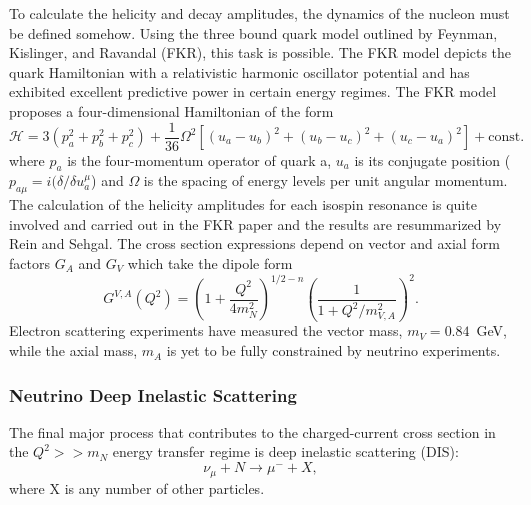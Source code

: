 To calculate the helicity and decay amplitudes, the dynamics of the nucleon must be defined somehow. Using the three bound quark model outlined by Feynman, Kislinger, and Ravandal \cite{FKR} (FKR), this task is possible. The FKR model depicts the quark Hamiltonian with a relativistic harmonic oscillator potential and has exhibited excellent predictive power in certain energy regimes. The FKR model proposes a four-dimensional Hamiltonian of the form
\begin{equation}
\mathcal{H} = 3(p_a^2+p_b^2+p_c^2)+\frac{1}{36}\Omega^2\left[(u_a-u_b)^2+(u_b-u_c)^2+(u_c-u_a)^2\right]+\text{const.}
\end{equation}
where $p_a$ is the four-momentum operator of quark a, $u_a$ is its conjugate position ($p_{a\mu} = i(\delta/\delta u_a^\mu$) and $\Omega$ is the spacing of energy levels per unit angular momentum. The calculation of the helicity amplitudes for each isospin resonance is quite involved and carried out in the FKR paper and the results are resummarized by Rein and Sehgal. The cross section expressions depend on vector and axial form factors $G_A$ and $G_V$ which take the dipole form
\begin{equation}
G^{V,A}(Q^2) = \left( 1+ \frac{Q^2}{4m_N^2}\right)^{1/2-n}\left(\frac{1}{1+Q^2/m_{V,A}^2}\right)^2.
\end{equation}
Electron scattering experiments have measured the vector mass, $m_V = 0.84$~GeV, while the axial mass, $m_A$ is yet to be fully constrained by neutrino experiments.

\subsubsection{Neutrino Deep Inelastic Scattering}
\label{sec:disxsec}

The final major process that contributes to the charged-current cross section in the $Q^2>>m_N$ energy transfer regime is deep inelastic scattering (DIS):
\begin{equation}
\nu_\mu + N \rightarrow \mu^{-}+X,
\end{equation}
where X is any number of other particles. 


